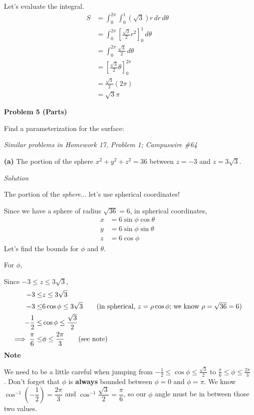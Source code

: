 \documentclass{article}
\newcommand{\lrp}[1]{\left( #1 \right)}
\newcommand{\lrb}[1]{\left[ #1 \right]}
\newcommand{\Solution}{\textit{Solution}}
\begin{document}
Let's evaluate the integral.
\begin{align*}
    S&=\int_0^{2\pi}\int_0^1 \lrp{\sqrt{3}}r\,dr\,d\theta\tag{don't forget our Jacobian $r$!}\\
    &=\int_0^{2\pi}\lrb{\frac{\sqrt{3}}{2}r^2}_0^1\,d\theta\\
    &=\int_0^{2\pi}\frac{\sqrt{3}}{2}\,d\theta\\
    &=\lrb{\frac{\sqrt{3}}{2}\theta}_0^{2\pi}\\
    &=\frac{\sqrt{3}}{2}\lrp{2\pi}\\
    &=\boxed{\sqrt{3}\pi}
\end{align*}
{}\textbf{Problem 5 (Parts)}

Find a parameterization for the surface:

\textit{Similar problems in Homework 17, Problem 1; Campuswire \#64}

{}\textbf{(a)} The portion of the sphere $x^2+y^2+z^2=36$ between $z=-3$ and $z=3\sqrt{3}$.

\Solution

The portion of the \textit{sphere}... let's use spherical coordinates!

Since we have a sphere of radius $\sqrt{36}=6$, in spherical coordinates,
\begin{align*}
    x &= 6\sin\phi\cos\theta\\
    y&=6\sin\phi\sin\theta\\
    z&=6\cos\phi
\end{align*}
Let's find the bounds for $\phi$ and $\theta$.

For $\phi$,

Since $-3\leq z \leq 3\sqrt{3}$,
\begin{align*}
    -3\leq &z \leq 3\sqrt{3}\\
    -3 \leq &6\cos \phi \leq 3\sqrt{3}\tag{in spherical, $z=\rho\cos\phi$; we know $\rho=\sqrt{36}=6$}\\
    -\frac{1}{2}\leq &\cos \phi \leq \frac{\sqrt{3}}{2}\\
    \implies \frac{\pi}{6}\leq & \phi \leq \frac{2\pi}{3}\tag{see note}
\end{align*}
\textbf{Note}

We need to be a little careful when jumping from $\displaystyle -\frac{1}{2}\leq \cos \phi \leq \frac{\sqrt{3}}{2}$ to $\displaystyle \frac{\pi}{6}\leq \phi \leq \frac{2\pi}{3}$. Don't forget that $\phi$ is \textbf{always} bounded between $\phi=0$ and $\phi=\pi$. We know $\cos^{-1}\lrp{-\dfrac{1}{2}}=\dfrac{2\pi}{3}$ and $\cos^{-1}\dfrac{\sqrt{3}}{2}=\dfrac{\pi}{6}$, so our $\phi$ angle must be in between those two values.
\end{document}
